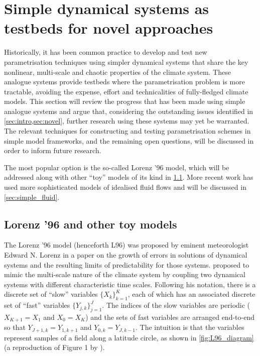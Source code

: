 \documentclass[titlepage,twoside]{article}
\numberwithin{equation}{section}
\begin{document}
\clearpage
\section{Simple dynamical systems as testbeds for novel approaches}%
\label{sec:simple}
Historically, it has been common practice to develop and test new
parametrisation techniques using simpler dynamical systems that share the key
nonlinear, multi-scale and chaotic properties of the climate system. These
analogue systems provide testbeds where the parametrisation problem is more
tractable, avoiding the expense, effort and technicalities of fully-fledged
climate models. This section will review the progress that has been made using
simple analogue systems and argue that, considering the outstanding issues
identified in \cref{sec:intro,sec:novel}, further research using these systems
may yet be warranted. The relevant techniques for constructing and testing
parametrisation schemes in simple model frameworks, and the remaining open
questions, will be discussed in order to inform future research.

The most popular option is the so-called Lorenz '96 model, which will be
addressed along with other ``toy'' models of its kind in \cref{sec:l96}.
More recent work has used more sophisticated models of idealised fluid flows
and will be discussed in \cref{sec:simple_fluid}.


\subsection{Lorenz '96 and other toy models} \label{sec:l96} The Lorenz '96
model (henceforth L96) was proposed by eminent meteorologist Edward N. Lorenz
in a \citeyear{lorenz1995} paper \parencite{lorenz1995} on the growth of errors
in solutions of dynamical systems and the resulting limits of predictability
for those systems. \citeauthor{lorenz1995} proposed to mimic the multi-scale
nature of the climate system by coupling two dynamical systems with different
characteristic time scales. Following his notation, there is a discrete set of
``slow'' variables $\{X_k\}_{k=1}^K$, each of which has an associated discrete
set of ``fast'' variables $\{Y_{j,k}\}_{j=1}^J$. The indices of the slow
variables are periodic ($X_{K+1} = X_1$ and $X_0 = X_K$) and the sets of fast
variables are arranged end-to-end so that $Y_{J+1,k} = Y_{1,k+1}$ and $Y_{0,k}
= Y_{J,k-1}$. The intuition is that the variables represent samples of a field
along a latitude circle, as shown in \cref{fig:L96_diagram} (a reproduction of
Figure 1 by \textcite{russell2017}).
\end{document}
